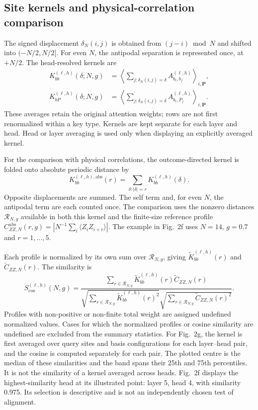 \documentclass[11pt,a4paper]{article}
\newcommand{\TBD}[1]{\textcolor{red!70!black}{\textsf{[TBD: #1]}}}
\newcommand{\subhead}[1]{\subsection*{#1}}
\begin{document}
\subhead{Site kernels and physical-correlation comparison}
The signed displacement $\delta_N(i,j)$ is obtained from $(j-i)\bmod N$
and shifted into $(-N/2,N/2]$. For even $N$, the antipodal separation is
represented once, at $+N/2$. The head-resolved kernels are
\begin{equation}
\begin{split}
K^{(\ell,h)}_{bb}(\delta;N,g)
&=\left\langle\sum_{j:\delta_N(i,j)=\delta}
A^{(\ell,h)}_{b_i,b_j}\right\rangle_{i,\mathbf{P}},\\
K^{(\ell,h)}_{bP}(\delta;N,g)
&=\left\langle\sum_{j:\delta_N(i,j)=\delta}
A^{(\ell,h)}_{b_i,P_j}\right\rangle_{i,\mathbf{P}}.
\end{split}
\label{supp:eq:attention_kernels}
\end{equation}
These averages retain the original attention weights; rows are not first
renormalized within a key type. Kernels are kept separate for each layer
and head. Head or layer averaging is used only when displaying an
explicitly averaged kernel.

For the comparison with physical correlations, the outcome-directed
kernel is folded onto absolute periodic distance by
\begin{equation}
K^{(\ell,h),\mathrm{abs}}_{bb}(r)
=\sum_{\delta:|\delta|=r}K^{(\ell,h)}_{bb}(\delta).
\label{supp:eq:kernel_fold}
\end{equation}
Opposite displacements are summed. The self term and, for even $N$, the
antipodal term are each counted once. The comparison uses the nonzero
distances $\mathcal{R}_{N,g}$ available in both this kernel and the
finite-size reference profile
$C_{ZZ,N}^{\mathrm{abs}}(r,g)=|N^{-1}\sum_i\langle Z_iZ_{i+r}\rangle|$.
The example in Fig.~2f uses $N=14$, $g=0.7$ and $r=1,\ldots,5$.

Each profile is normalized by its own sum over $\mathcal{R}_{N,g}$,
giving $\widetilde{K}^{(\ell,h)}_{bb}(r)$ and
$\widetilde{C}_{ZZ,N}(r)$. The similarity is
\begin{equation}
S^{(\ell,h)}_{\mathrm{cos}}(N,g)=
\frac{\sum_{r\in\mathcal{R}_{N,g}}
\widetilde{K}^{(\ell,h)}_{bb}(r)\widetilde{C}_{ZZ,N}(r)}
{\sqrt{\sum_{r\in\mathcal{R}_{N,g}}\widetilde{K}^{(\ell,h)}_{bb}(r)^2}
\sqrt{\sum_{r\in\mathcal{R}_{N,g}}\widetilde{C}_{ZZ,N}(r)^2}}.
\label{supp:eq:attention_cosine}
\end{equation}
Profiles with non-positive or non-finite total weight are assigned
undefined normalized values. Cases for which the normalized profiles or cosine similarity are undefined are excluded from the summary statistics.
For Fig.~2g, the kernel is first averaged over query sites and basis
configurations for each layer--head pair, and the cosine is computed
separately for each pair. The plotted centre is the median of these
similarities and the band spans their 25th and 75th percentiles. It is
not the similarity of a kernel averaged across heads. Fig.~2f displays
the highest-similarity head at its illustrated point: layer 5, head 4, with similarity 0.975. Its selection is descriptive
and is not an independently chosen test of alignment.
\end{document}
